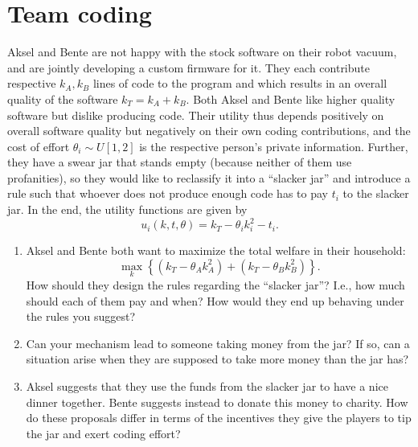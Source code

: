 \documentclass[a4paper]{article}
\begin{document}
%	
\fi



\section{Team coding}
Aksel and Bente are not happy with the stock software on their robot vacuum, and are jointly developing a custom firmware for it. They each contribute respective $k_A, k_B$ lines of code to the program and which results in an overall quality of the software $k_T = k_A + k_B$. Both Aksel and Bente like higher quality software but dislike producing code. Their utility thus depends positively on overall software quality but negatively on their own coding contributions, and the cost of effort $\theta_i \sim U[1,2]$ is the respective person's private information. Further, they have a swear jar that stands empty (because neither of them use profanities), so they would like to reclassify it into a ``slacker jar'' and introduce a rule such that whoever does not produce enough code has to pay $t_i$ to the slacker jar.
In the end, the utility functions are given by 
$$u_i(k,t,\theta) = k_T - \theta_i k_i^2 - t_i.$$ 

\begin{enumerate}
	\item Aksel and Bente both want to maximize the total welfare in their household: $$\max_k \left\{ \left( k_T - \theta_A k_A^2 \right) + \left( k_T - \theta_B k_B^2 \right) \right\}.$$ 
	How should they design the rules regarding the ``slacker jar''? I.e., how much should each of them pay and when? How would they end up behaving under the rules you suggest?
	
	\item Can your mechanism lead to someone taking money from the jar? If so, can a situation arise when they are supposed to take more money than the jar has?
	
	\item Aksel suggests that they use the funds from the slacker jar to have a nice dinner together. Bente suggests instead to donate this money to charity. How do these proposals differ in terms of the incentives they give the players to tip the jar and exert coding effort? %
\end{enumerate}
\end{document}
